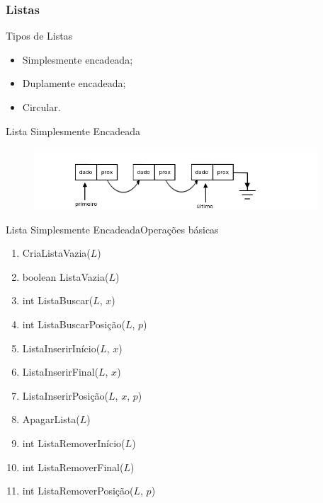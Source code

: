 \documentclass[aspectratio=169]{beamer}
\begin{document}

\begin{frame}
\frametitle{Listas}
Tipos de Listas
\begin{itemize}
 \item Simplesmente encadeada; 
 \item Duplamente encadeada;
 \item Circular.
\end{itemize}
\end{frame}


\begin{frame}{Lista Simplesmente Encadeada}
\begin{figure}[!h]
  \centering
  \includegraphics[width=300pt]{imgs/lista_simplesmente_encadeada.png}
  \label{fig_lista_encadeada}
\end{figure}
\end{frame}


\begin{frame}{Lista Simplesmente Encadeada}{Operações básicas}
\begin{enumerate}
 \item CriaListaVazia($L$)
 \item boolean ListaVazia($L$)
 \item int ListaBuscar($L$, $x$)
 \item int ListaBuscarPosição($L$, $p$)
 \item ListaInserirInício($L$, $x$)
 \item ListaInserirFinal($L$, $x$)
 \item ListaInserirPosição($L$, $x$, $p$)
 \item ApagarLista($L$)
 \item int ListaRemoverInício($L$) 
 \item int ListaRemoverFinal($L$) 
 \item int ListaRemoverPosição($L$, $p$) 
\end{enumerate}
\end{frame}

\end{document}
